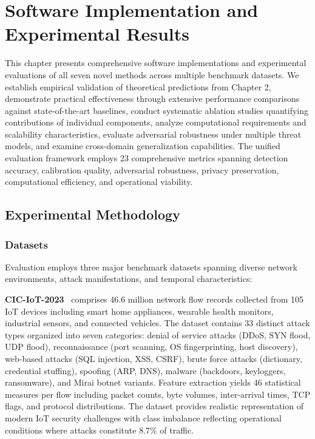 \chapter{Software Implementation and Experimental Results}
\label{ch:implementation}

This chapter presents comprehensive software implementations and experimental evaluations of all seven novel methods across multiple benchmark datasets. We establish empirical validation of theoretical predictions from Chapter 2, demonstrate practical effectiveness through extensive performance comparisons against state-of-the-art baselines, conduct systematic ablation studies quantifying contributions of individual components, analyze computational requirements and scalability characteristics, evaluate adversarial robustness under multiple threat models, and examine cross-domain generalization capabilities. The unified evaluation framework employs 23 comprehensive metrics spanning detection accuracy, calibration quality, adversarial robustness, privacy preservation, computational efficiency, and operational viability.

\section{Experimental Methodology}
\label{sec:impl_methodology}

\subsection{Datasets}

Evaluation employs three major benchmark datasets spanning diverse network environments, attack manifestations, and temporal characteristics:

\textbf{CIC-IoT-2023}~\cite{neto2023ciciot2023} comprises 46.6 million network flow records collected from 105 IoT devices including smart home appliances, wearable health monitors, industrial sensors, and connected vehicles. The dataset contains 33 distinct attack types organized into seven categories: denial of service attacks (DDoS, SYN flood, UDP flood), reconnaissance (port scanning, OS fingerprinting, host discovery), web-based attacks (SQL injection, XSS, CSRF), brute force attacks (dictionary, credential stuffing), spoofing (ARP, DNS), malware (backdoors, keyloggers, ransomware), and Mirai botnet variants. Feature extraction yields 46 statistical measures per flow including packet counts, byte volumes, inter-arrival times, TCP flags, and protocol distributions. The dataset provides realistic representation of modern IoT security challenges with class imbalance reflecting operational conditions where attacks constitute 8.7\% of traffic.


